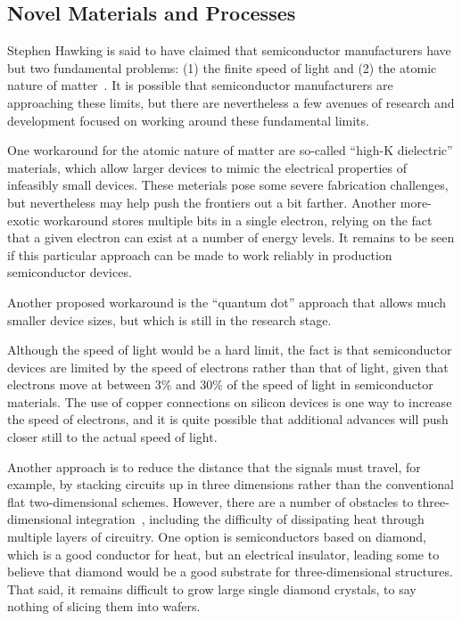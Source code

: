 \subsection{Novel Materials and Processes}
\label{sec:cpu:Novel Materials and Processes}

Stephen Hawking is said to have claimed that semiconductor manufacturers
have but two fundamental problems: (1) the finite speed of light and
(2) the atomic nature of matter~\cite{BryanGardiner2007}.
It is possible that semiconductor manufacturers are approaching these
limits, but there are nevertheless a few avenues of research and
development focused on working around these fundamental limits.

One workaround for the atomic nature of matter are so-called
``high-K dielectric'' materials, which allow larger devices to mimic the
electrical properties of infeasibly small devices.
These meterials pose some severe fabrication challenges, but nevertheless
may help push the frontiers out a bit farther.
Another more-exotic workaround stores multiple bits in a single electron,
relying on the fact that a given electron can exist at a number of
energy levels.
It remains to be seen if this particular approach can be made to work
reliably in production semiconductor devices.

Another proposed workaround is the ``quantum dot'' approach that
allows much smaller device sizes, but which is still in the research
stage.

Although the speed of light would be a hard limit, the fact is that
semiconductor devices are limited by the speed of electrons rather
than that of light, given that electrons move at between 3\% and 30\%
of the speed of light in semiconductor materials.
The use of copper connections on silicon devices is one way to increase
the speed of electrons, and it is quite possible that additional
advances will push closer still to the actual speed of light.

Another approach is to reduce the distance that the signals must
travel, for example, by stacking circuits up in three dimensions
rather than the conventional flat two-dimensional schemes.
However, there are a number of obstacles to three-dimensional
integration~\cite{JohnKnickerbocker2008_3DI},
including the difficulty of dissipating heat through multiple
layers of circuitry.
One option is semiconductors based on diamond, which is a good conductor
for heat, but an electrical insulator,
leading some to believe that diamond would be a good substrate for
three-dimensional structures.
That said, it remains difficult to grow large single diamond crystals,
to say nothing of slicing them into wafers.

